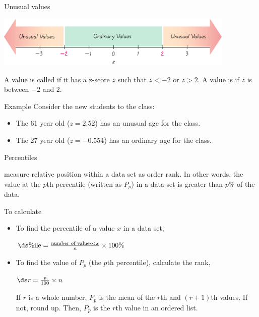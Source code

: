 \documentclass[xcolor=table, handout]{beamer}
\begin{document}
\begin{frame}{Unusual values}

{\centering
\includegraphics[width=4.5in]{../images/ch03_unusual} \par
}

\begin{block}{}
\large
A value is called  if it has a z-score $z$ such that $z< -2$ or $z > 2$. A value is  if $z$ is between $-2$ and $2$.
\end{block}

\pause
\begin{exampleblock}{Example}
Consider the new students to the class:
\begin{itemize}
\item The 61 year old ($z=2.52$) has an unusual age for the class. 
\item The 27 year old ($z=-0.554$) has an ordinary age for the class.
\end{itemize}
\end{exampleblock}
\end{frame}

\begin{frame}{Percentiles}
\begin{block}{}
\large
{} measure relative position within a data set as order rank. In other words, the value at the $p$th percentile (written as $P_p$) in a data set is greater than $p$\% of the data.
\end{block}

\pause
\begin{block}{To calculate}
\begin{itemize}
\item To find the percentile of a value $x$ in a data set,\\
\smallskip
{\centering
$\ds \%\text{ile} = \frac{\text{number of values} < x}{n} \times 100\%$
\par}
\medskip
\pause\item To find the value of $P_p$ (the $p$th percentile), calculate the rank,\\
\smallskip
{\centering
$\ds r = \frac p {100} \times n$
\par}
\medskip
If $r$ is a whole number, $P_p$ is the mean of the $r$th and $(r+1)$th values. If not, round up. Then, $P_p$ is the $r$th value in an ordered list.
\end{itemize}
\end{block}
\end{frame}
\end{document}
